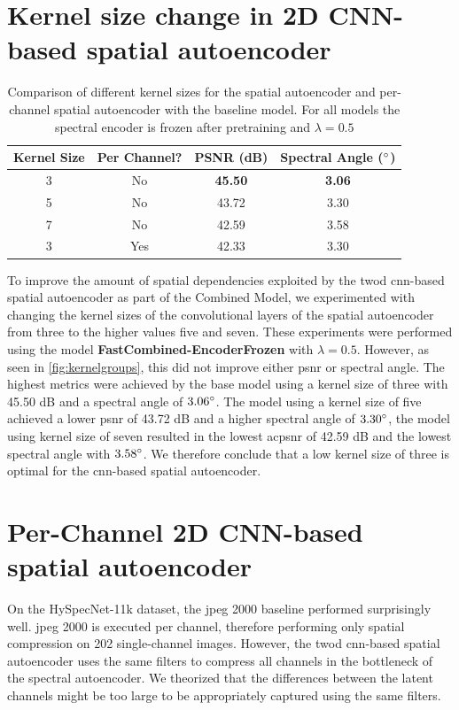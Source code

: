 \section{Kernel size change in 2D CNN-based spatial autoencoder}
\begin{table}
\centering
\begin{tabular}{|c|c|c|c|}
\hline
Kernel Size & Per Channel? & PSNR (dB) & Spectral Angle ($\degree$) \\
\hline\hline
3 & No & \textbf{45.50} & \textbf{3.06} \\
\hline
5 & No & 43.72 & 3.30 \\
\hline
7 & No & 42.59 & 3.58 \\
\hline
3 & Yes & 42.33 & 3.30 \\
\hline
\end{tabular}
\caption{Comparison of different kernel sizes for the spatial autoencoder and per-channel spatial autoencoder with the baseline model. For all models the spectral encoder is frozen after pretraining and $\lambda = 0.5$}
\label{fig:kernelgroups}
\end{table}

To improve the amount of spatial dependencies exploited by the \ac{twod} \ac{cnn}-based spatial autoencoder as part of the Combined Model, we experimented with changing the kernel sizes of the convolutional layers of the spatial autoencoder from three to the higher values five and seven. These experiments were performed using the model \textbf{FastCombined-EncoderFrozen} with $\lambda=0.5$. However, as seen in \autoref{fig:kernelgroups}, this did not improve either \ac{psnr} or spectral angle. The highest metrics were achieved by the base model using a kernel size of three with 45.50 dB and a spectral angle of $3.06 \degree$. The model using a kernel size of five achieved a lower \ac{psnr} of 43.72 dB and a higher spectral angle of $3.30 \degree$, the model using kernel size of seven resulted in the lowest ac{psnr} of 42.59 dB and the lowest spectral angle with $3.58 \degree$. We therefore conclude that a low kernel size of three is optimal for the \ac{cnn}-based spatial autoencoder.

\section{Per-Channel 2D CNN-based spatial autoencoder}
On the HySpecNet-11k dataset, the \ac{jpeg} 2000 baseline performed surprisingly well. \Ac{jpeg} 2000 is executed per channel, therefore performing only spatial compression on 202 single-channel images. However, the \ac{twod} \ac{cnn}-based spatial autoencoder uses the same filters to compress all channels in the bottleneck of the spectral autoencoder. We theorized that the differences between the latent channels might be too large to be appropriately captured using the same filters. 

